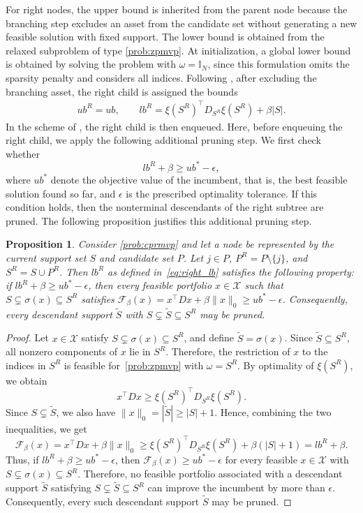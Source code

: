\documentclass[11pt]{article}
\theoremstyle{plain}
\newtheorem{proposition}{Proposition}
\theoremstyle{definition}
\theoremstyle{plain}
\newcommand{\II}{{\mathbb I}}
\newcommand{\abs}[1]{\left\lvert#1\right\rvert}
\newcommand{\tpose}[1]{#1^{\top}}
\newcommand{\cF}{{\mathcal F}}
\newcommand{\cX}{{\mathcal X}}
\begin{document}
For right nodes, the upper bound is inherited from the parent node because the branching step excludes an asset from the candidate set without generating a new feasible solution with fixed support. The lower bound is obtained from the relaxed subproblem of type \eqref{prob:zpmvp}. At initialization, a global lower bound is obtained by solving the problem with $\omega=\II_N$, since this formulation omits the sparsity penalty and considers all indices. Following \cite{SenAkkayaPinar2025}, after excluding the branching asset, the right child is assigned the bounds
\begin{align}\label{eq:right_lb}
     ub^R=ub,
    \qquad
    lb^R = \xi(S^R)^\top D_{S^R}\xi(S^R) + \beta \abs{S}.
\end{align}
In the scheme of \cite{SenAkkayaPinar2025}, the right child is then enqueued. Here, before enqueuing the right child, we apply the following additional pruning step. We first check whether
\[
    lb^R+\beta \geq ub^*-\epsilon,
\]
where $ub^*$ denote the objective value of the incumbent, that is, the best feasible solution found so far, and $\epsilon$ is the prescribed optimality tolerance. 
If this condition holds, then the nonterminal descendants of the right subtree are pruned. The following proposition justifies this additional pruning step.
\begin{proposition}\label{prop:pruning}
    Consider \eqref{prob:cprmvp} and let a node be represented by the current support set $S$ and candidate set $P$. Let $j\in P$, $P^R=P\setminus\{j\}$, and $S^R=S\cup P^R$. Then $lb^R$ as defined in~\eqref{eq:right_lb} satisfies the following property: if $lb^R+\beta \geq ub^*-\epsilon$, then every feasible portfolio $x\in\cX$ such that $S\subsetneq \sigma(x)\subseteq S^R$ satisfies $\cF_\beta(x)=\tpose{x}Dx+\beta\|x\|_0 \geq ub^*-\epsilon$. Consequently, every descendant support $\tilde{S}$ with $S\subsetneq \tilde{S}\subseteq S^R$ may be pruned.
\end{proposition}
\begin{proof}
    Let $x\in\cX$ satisfy $S\subsetneq \sigma(x)\subseteq S^R$, and define $\tilde{S}=\sigma(x)$. Since $\tilde{S}\subseteq S^R$, all nonzero components of $x$ lie in $S^R$. Therefore, the restriction of $x$ to the indices in $S^R$ is feasible for~\eqref{prob:zpmvp} with $\omega=S^R$. By optimality of $\xi(S^R)$, we obtain
    \[
        \tpose{x}Dx \geq \xi(S^R)^\top D_{S^R}\xi(S^R).
    \]
    Since $S\subsetneq \tilde{S}$, we also have $\|x\|_0 = |\tilde{S}| \geq |S|+1$. Hence, combining the two inequalities, we get
    \[
      \cF_\beta(x)=\tpose{x}Dx+\beta\|x\|_0 \geq \xi(S^R)^\top D_{S^R}\xi(S^R)+\beta(|S|+1)=lb^R+\beta.
    \]
    Thus, if $lb^R+\beta\geq ub^*-\epsilon$, then $\cF_\beta(x) \geq ub^*-\epsilon$ for every feasible $x\in\cX$ with $S\subsetneq \sigma(x)\subseteq S^R$. Therefore, no feasible portfolio associated with a descendant support $\tilde{S}$ satisfying $S\subsetneq \tilde{S}\subseteq S^R$ can improve the incumbent by more than $\epsilon$. Consequently, every such descendant support $\tilde{S}$ may be pruned.
\end{proof}
\end{document}
